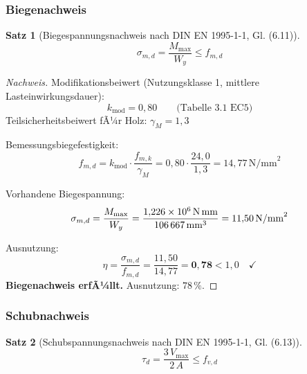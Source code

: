 ﻿\documentclass[12pt,a4paper]{article}
\theoremstyle{definition}
\theoremstyle{plain}
\newtheorem{theorem}{Satz}
\theoremstyle{remark}
\begin{document}
\subsubsection{Biegenachweis}

\begin{theorem}[Biegespannungsnachweis nach DIN EN 1995-1-1, Gl. (6.11)]
\begin{equation}
  \sigma_{m,d} = \frac{M_{\max}}{W_y} \leq f_{m,d}
\end{equation}
\end{theorem}

\begin{proof}[Nachweis]
Modifikationsbeiwert (Nutzungsklasse 1, mittlere Lasteinwirkungsdauer):
\begin{equation*}
  k_{\text{mod}} = 0{,}80 \qquad \text{(Tabelle 3.1 EC5)}
\end{equation*}
Teilsicherheitsbeiwert fÃ¼r Holz: $\gamma_M = 1{,}3$

Bemessungsbiegefestigkeit:
\begin{equation*}
  f_{m,d} = k_{\text{mod}} \cdot \frac{f_{m,k}}{\gamma_M}
          = 0{,}80 \cdot \frac{24{,}0}{1{,}3} = 14{,}77\,\text{N/mm}^2
\end{equation*}

Vorhandene Biegespannung:
\begin{equation*}
  \sigma_{m,d} = \frac{M_{\max}}{W_y}
              = \frac{1{,}226 \times 10^6\,\text{N\,mm}}{106\,667\,\text{mm}^3}
              = 11{,}50\,\text{N/mm}^2
\end{equation*}

Ausnutzung:
\begin{equation*}
  \eta = \frac{\sigma_{m,d}}{f_{m,d}} = \frac{11{,}50}{14{,}77} = \mathbf{0{,}78} < 1{,}0 \quad \checkmark
\end{equation*}
\textbf{Biegenachweis erfÃ¼llt.} Ausnutzung: $78\,\%$.
\end{proof}

\subsubsection{Schubnachweis}

\begin{theorem}[Schubspannungsnachweis nach DIN EN 1995-1-1, Gl. (6.13)]
\begin{equation}
  \tau_{d} = \frac{3\,V_{\max}}{2\,A} \leq f_{v,d}
\end{equation}
\end{theorem}
\end{document}
